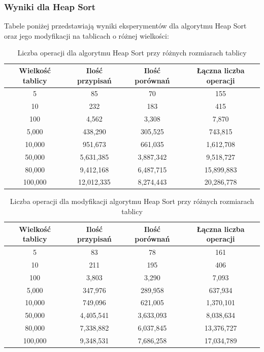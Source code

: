 \documentclass{article}
\begin{document}
\subsubsection{Wyniki dla Heap Sort}
Tabele poniżej przedstawiają wyniki eksperymentów dla algorytmu Heap Sort oraz jego modyfikacji na tablicach o różnej wielkości:
\begin{table}[H]
    \centering
    \begin{tabular}{|c|c|c|c|}
    \hline
    \textbf{Wielkość tablicy} & \textbf{Ilość przypisań} & \textbf{Ilość porównań} & \textbf{Łączna liczba operacji} \\ \hline
    5 & 85 & 70 & 155 \\ \hline
    10 & 232 & 183 & 415 \\ \hline
    100 & 4,562 & 3,308 & 7,870 \\ \hline
    5,000 & 438,290 & 305,525 & 743,815 \\ \hline
    10,000 & 951,673 & 661,035 & 1,612,708 \\ \hline
    50,000 & 5,631,385 & 3,887,342 & 9,518,727 \\ \hline
    80,000 & 9,412,168 & 6,487,715 & 15,899,883 \\ \hline
    100,000 & 12,012,335 & 8,274,443 & 20,286,778 \\ \hline
    \end{tabular}
    \caption{Liczba operacji dla algorytmu Heap Sort przy różnych rozmiarach tablicy}
    \label{tab:heap_results}
\end{table}

\begin{table}[H]
    \centering
    \begin{tabular}{|c|c|c|c|}
    \hline
    \textbf{Wielkość tablicy} & \textbf{Ilość przypisań} & \textbf{Ilość porównań} & \textbf{Łączna liczba operacji} \\ \hline
    5 & 83 & 78 & 161 \\ \hline
    10 & 211 & 195 & 406 \\ \hline
    100 & 3,803 & 3,290 & 7,093 \\ \hline
    5,000 & 347,976 & 289,958 & 637,934 \\ \hline
    10,000 & 749,096 & 621,005 & 1,370,101 \\ \hline
    50,000 & 4,405,541 & 3,633,093 & 8,038,634 \\ \hline
    80,000 & 7,338,882 & 6,037,845 & 13,376,727 \\ \hline
    100,000 & 9,348,531 & 7,686,258 & 17,034,789 \\ \hline
    \end{tabular}
    \caption{Liczba operacji dla modyfikacji algorytmu Heap Sort przy różnych rozmiarach tablicy}
    \label{tab:m_heap_results}
\end{table}
\end{document}
